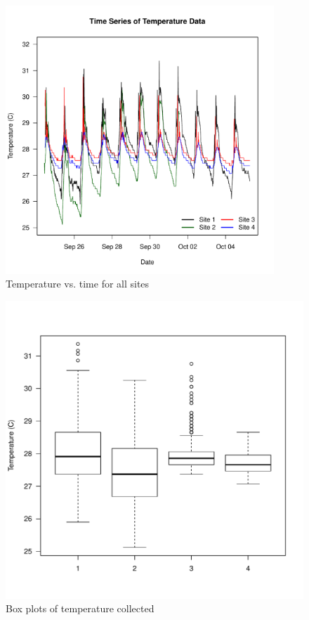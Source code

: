 \documentclass{article}\usepackage[]{graphicx}\usepackage[]{color}
\makeatletter
\def\maxwidth{ %
  \ifdim\Gin@nat@width>\linewidth
    \linewidth
  \else
    \Gin@nat@width
  \fi
}
\newenvironment{knitrout}{}{} %
\makeatother
\begin{document}
\begin{figure}[!ht]
\includegraphics[width=0.90\textwidth]{Figures/Temp}
\caption{Temperature vs. time for all sites}
\label{fig:Temp}
\end{figure}
\begin{figure}
\begin{knitrout}
\color{fgcolor}
\includegraphics[width=\maxwidth]{figure/unnamed-chunk-4-1} 

\end{knitrout}
\label{fig:tempbox}
\caption{Box plots of temperature collected}
\end{figure}
\end{document}
